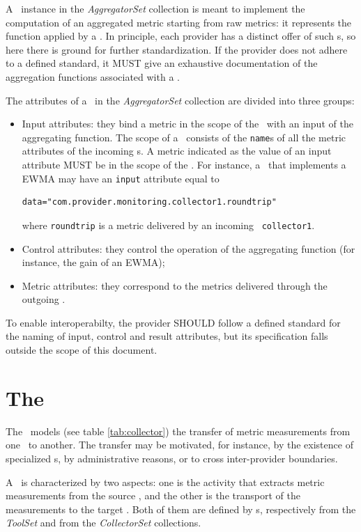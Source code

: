 \documentclass[12pt]{article}  %
\begin{document}
{A \mi\ instance in the {\em AggregatorSet} collection is meant to implement the computation of an aggregated metric starting from raw metrics: it represents the function applied by a \sens. In principle, each provider has a distinct offer of such \mi s, so here there is ground for further standardization. If the provider does not adhere to a defined standard, it MUST give an exhaustive documentation of the aggregation functions associated with a \mi.

The attributes of a \mi\ in the {\em AggregatorSet} collection are divided into three groups:

\begin{itemize}
\item Input attributes: they bind a metric in the scope of the \sens\ with an input of the aggregating function. The scope of a \sens\ consists of the {\tt name}s of all the metric attributes of the incoming \coll s. A metric indicated as the value of an input attribute MUST be in the scope of the \sens . For instance, a \sens\ that implements a EWMA may have an {\tt input} attribute equal to 
\begin{verbatim}
data="com.provider.monitoring.collector1.roundtrip"
\end{verbatim}
where \verb&roundtrip& is a metric delivered by an incoming \coll\ {\tt collector1}.
\item Control attributes: they control the operation of the aggregating function (for instance, the gain of an EWMA);
\item Metric attributes: they correspond to the metrics delivered through the outgoing \coll.
\end{itemize}

To enable interoperabilty, the provider SHOULD follow a defined standard for the naming of input, control and result attributes, but its specification falls outside the scope of this document.

\section{The \coll}



The \coll\ models  (see table \ref{tab:collector}) the transfer of metric measurements from one \rs\ to another. The transfer may be motivated, for instance, by the existence of specialized \rs s, by administrative reasons, or to cross inter-provider boundaries.

A \coll\ is characterized by two aspects: one is the activity that extracts metric measurements from the source \rs, and the other is the transport of the measurements to the target \rs. Both of them are defined by \mi s, respectively from the {\em ToolSet} and from the {\em CollectorSet} collections.

}
\end{document}
